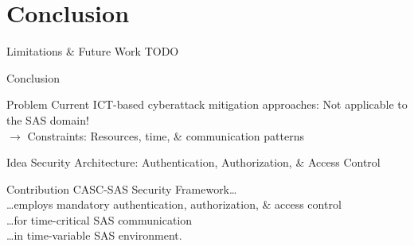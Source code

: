 \documentclass[en]{sdqbeamer}
\begin{document}
\section{Conclusion}
\begin{frame}{Limitations \& Future Work}
    TODO
\end{frame}
\begin{frame}{Conclusion}
    \begin{redblock}{Problem}
        Current ICT-based cyberattack mitigation approaches: Not applicable to the SAS domain!
        \\$\rightarrow$ Constraints: Resources, time, \& communication patterns
    \end{redblock}
    \begin{greenblock}{Idea}
        Security Architecture: Authentication, Authorization, \& Access Control
    \end{greenblock}
    \begin{blueblock}{Contribution}
        CASC-SAS Security Framework\dots
        \\\dots employs mandatory authentication, authorization, \& access control
        \\\dots for time-critical SAS communication
        \\\dots in time-variable SAS environment.
    \end{blueblock}
\end{frame}
\end{document}
